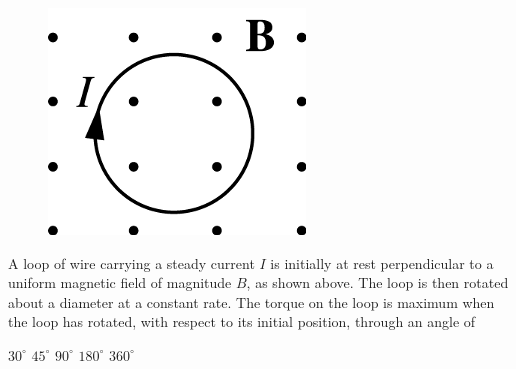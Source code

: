 \begin{figure}[H]
    \center
    \includegraphics[scale=0.25]{images/img-010-019.png}
\end{figure}

\begin{questions}\setcounter{question}{26}\question
A loop of wire carrying a steady current $I$ is initially at rest perpendicular to a uniform magnetic field of magnitude $B$, as shown above. The loop is then rotated about a diameter at a constant rate. The torque on the loop is maximum when the loop has rotated, with respect to its initial position, through an angle of

\begin{oneparchoices}
\choice $30^{\circ}$
\choice $45^{\circ}$
\choice $90^{\circ}$
\choice $180^{\circ}$
\choice $360^{\circ}$
\end{oneparchoices}\end{questions}

